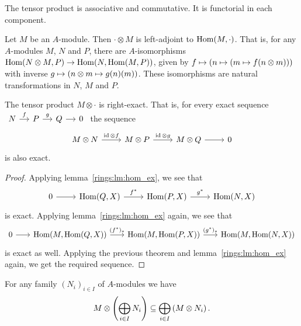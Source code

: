 \begin{opomba}
The tensor product is associative and commutative. It is functorial
in each component.
\end{opomba}

\begin{izrek}
Let $M$ be an $A$-module. Then $\cdot \otimes M$ is left-adjoint to
$\operatorname{Hom}(M, \cdot)$. That is, for any $A$-modules $M$, $N$ and $P$,
there are $A$-isomorphisms
$\operatorname{Hom}(N \otimes M, P) \to \operatorname{Hom}(N, \operatorname{Hom}(M, P))$, given by
$f \mapsto \left(n \mapsto \left(m \mapsto f(n \otimes m)\right)\right)$ with
inverse $g \mapsto \left(n \otimes m \mapsto g(n)(m)\right)$. These
isomorphisms are natural transformations in $N$, $M$ and $P$.
\end{izrek}


\begin{posledica}
The tensor product $M \otimes \cdot$ is right-exact. That is, for
every exact sequence
$\begin{tikzcd}[column sep=small]
N \arrow[r, "f"] &
P \arrow[r, "g"] &
Q \arrow[r] &
0
\end{tikzcd}$
the sequence
\[
\begin{tikzcd}
M \otimes N \arrow[r, "\id \otimes f"] &
M \otimes P \arrow[r, "\id \otimes g"] &
M \otimes Q \arrow[r] &
0
\end{tikzcd}
\]
is also exact.
\end{posledica}

\begin{proof}
Applying lemma~\ref{rings:lm:hom_ex}, we see that
\[
\begin{tikzcd}
0 \arrow[r] &
\Hom(Q, X) \arrow[r, "f^*"] &
\Hom(P, X) \arrow[r, "g^*"] &
\Hom(N, X)
\end{tikzcd}
\]
is exact. Applying lemma~\ref{rings:lm:hom_ex} again, we see that
\[
\begin{tikzcd}[column sep=scriptsize]
0 \arrow[r] &
\Hom(M, \Hom(Q, X)) \arrow[r, "(f^*)_*"] &
\Hom(M, \Hom(P, X)) \arrow[r, "(g^*)_*"] &
\Hom(M, \Hom(N, X))
\end{tikzcd}
\]
is exact as well. Applying the previous theorem and
lemma~\ref{rings:lm:hom_ex} again, we get the required sequence.
\end{proof}

\begin{posledica}
For any family $(N_i)_{i \in I}$ of $A$-modules we have
\[
M \otimes \left(\bigoplus_{i \in I} N_i\right) \subseteq
\bigoplus_{i \in I} \left(M \otimes N_i\right).
\]
\end{posledica}

